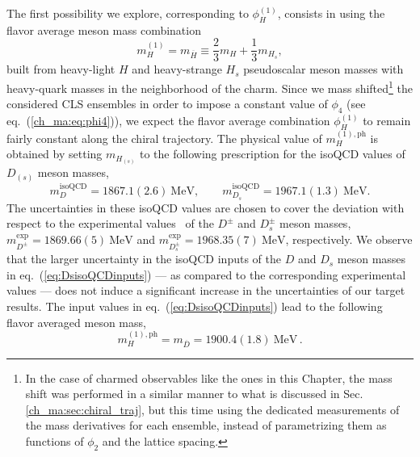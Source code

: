 The first possibility we explore, corresponding to $\phi_H^{(1)}$, consists in using the flavor average meson mass combination
\begin{equation}
        m_H^{(1)} = m_{\overline{H}} \equiv \frac{2}{3} m_H + \frac{1}{3}m_{H_s},
        \label{eq:fl_av_matching}
\end{equation}
built from heavy-light $H$ and heavy-strange $H_s$ pseudoscalar meson masses with heavy-quark masses in the neighborhood of the charm.
%
Since we mass shifted\footnote{In the case of charmed observables like the ones in this Chapter, the mass shift was performed in a similar manner to what is discussed in Sec. \ref{ch_ma:sec:chiral_traj}, but this time using the dedicated measurements of the mass derivatives for each ensemble, instead of parametrizing them as functions of $\phi_2$ and the lattice spacing.} the considered CLS ensembles in order to impose a constant value of $\phi_4$ (see eq.~(\ref{ch_ma:eq:phi4})), we expect the flavor average combination $\phi_H^{(1)}$ to remain fairly constant along the chiral trajectory. The physical value of $m_H^{(1), \mathrm{ph}}$ is obtained by setting $m_{H_{(s)}}$ to the following prescription for the isoQCD values of $D_{(s)}$ meson masses,
%
\begin{equation}
    m_D^{\mathrm{isoQCD}} = 1867.1(2.6)  \ \mathrm{MeV}, \qquad m_{D_s}^{\mathrm{isoQCD}} = 1967.1(1.3) \ \mathrm{MeV}.
\label{eq:DsisoQCDinputs}
\end{equation}
%
The uncertainties in these isoQCD values are chosen to cover the deviation with respect to the experimental values~\cite{ParticleDataGroup:2022pth} of the $D^{\pm}$ and $D_s^{\pm}$ meson masses, $m_{D^\pm}^{\mathrm{exp}} = 1869.66(5) \ \mathrm{MeV}$ and $m_{D_s^\pm}^{\mathrm{exp}} = 1968.35(7) \ \mathrm{MeV}$, respectively. We observe that the larger uncertainty in the isoQCD inputs of the $D$ and $D_s$ meson masses in eq.~(\ref{eq:DsisoQCDinputs}) --- as compared to the corresponding experimental values --- does not induce a significant increase in the uncertainties of our target results. The input values in eq.~(\ref{eq:DsisoQCDinputs}) lead to the following flavor averaged meson mass,
%
\begin{equation}
         m_H^{(1), \mathrm{ph}} = m_{\overline{D}} = 1900.4(1.8) \ \mathrm{MeV}\,.
\end{equation}
% 

